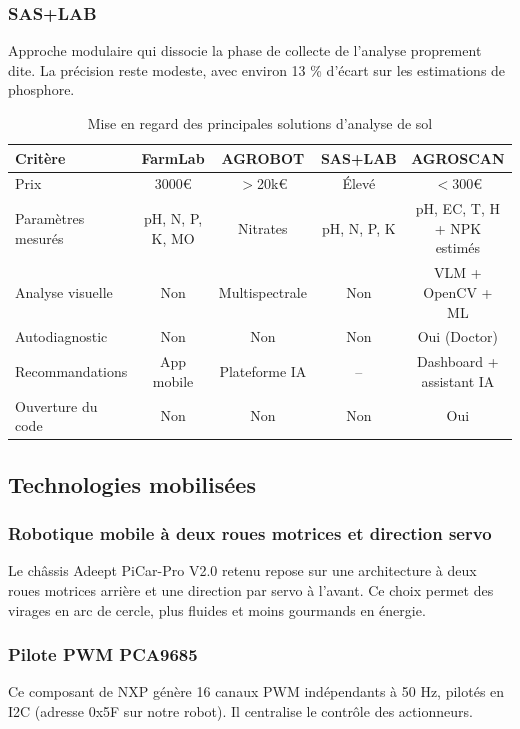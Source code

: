 \documentclass[a4paper,12pt,openany,titlepage]{scrartcl}
\begin{document}
\subsubsection{SAS+LAB}
Approche modulaire qui dissocie la phase de collecte de l’analyse proprement dite. La précision reste modeste, avec environ 13 \% d’écart sur les estimations de phosphore.

\begin{table}[H]
\centering
\begin{tabular}{|p{2.5cm}|c|c|c|c|}
\hline
\textbf{Critère} & \textbf{FarmLab} & \textbf{AGROBOT} & \textbf{SAS+LAB} & \textbf{AGROSCAN} \\
\hline
Prix & 3000\euro & $>$20k\euro & Élevé & $<$300\euro \\
\hline
Paramètres mesurés & pH, N, P, K, MO & Nitrates & pH, N, P, K & pH, EC, T, H + NPK estimés \\
\hline
Analyse visuelle & Non & Multispectrale & Non & VLM + OpenCV + ML \\
\hline
Autodiagnostic & Non & Non & Non & Oui (Doctor) \\
\hline
Recommandations & App mobile & Plateforme IA & -- & Dashboard + assistant IA \\
\hline
Ouverture du code & Non & Non & Non & Oui \\
\hline
\end{tabular}
\caption{Mise en regard des principales solutions d’analyse de sol}
\end{table}

\subsection{Technologies mobilisées}

\subsubsection{Robotique mobile à deux roues motrices et direction servo}
Le châssis Adeept PiCar-Pro V2.0 retenu repose sur une architecture à deux roues motrices arrière et une direction par servo à l’avant. Ce choix permet des virages en arc de cercle, plus fluides et moins gourmands en énergie.

\subsubsection{Pilote PWM PCA9685}
Ce composant de NXP génère 16 canaux PWM indépendants à 50 Hz, pilotés en I2C (adresse 0x5F sur notre robot). Il centralise le contrôle des actionneurs.
\end{document}
